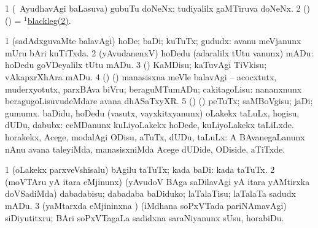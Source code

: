 \bentry
{}
\gl{\nA}
\bmng
\bnum
\num{1} (\kanmu\ AyudhavAgi baLasuva) gubuTu doNeNx; tudiyalilx gaMTiruva doNeNx. 
\num{2} (\birx) (\pArxparx) = \hyperref{kandict_b.pdf}{B}{blackleg(1)2}{$^1$blackleg(2)}. 
\enum
\emng
\eentry

\bentry
{}
\gl{\sakirx}
\bmng
\bnum
\num{1} (sadAdxguvaMte balavAgi) hoDe; baDi; kuTuTx; gududx:  avanu meVjanunx mUru bAri kuTiTxda. 
\num{2} (yAvudanenxV) hoDedu (adaralilx tUtu \mo vanunx) mADu:  hoDedu goVDeyalilx tUtu mADu. 
\num{3} (\ashi) KaMDisu; kaTuvAgi TiVkisu; vAkapxrXhAra mADu. 
\num{4} (\birx) (\ashi) manasisxna meVle balavAgi -- acocxtutx, muderxyotutx, parxBAva biVru; beraguMTumADu; cakitagoLisu:  nananxnunx beragugoLisuvudeMdare avana dhASaTxyXR. 
\num{5} (\birx) (\ashi) peTuTx; saMBoVgisu; jaDi; gumumx. 
 baDidu, hoDedu (vasutx, vayxkitxyanunx) 
\banum
{} oLakekx taLuLx, hogisu, dUDu, dabubx:  ceMDanunx kuLiyoLakekx hoDede, kuLiyoLakekx taLiLxde. 
 horakekx, Acege, modalAgi ODisu, aTuTx, dUDu, taLuLx:  A BAvanegaLanunx nAnu avana taleyiMda, manasisxniMda Acege dUDide, ODiside, aTiTxde. 
\eanum
\numie
\enum
\emng

\noindent
\gl{\akirx}
\bmng
\bnum
\num{1} (oLakekx parxveVshisalu) bAgilu taTuTx; kada baDi:  kada taTuTx. 
\num{2} (moVTAru yA itara eMjinunx) (yAvudoV BAga saDilavAgi yA itara yAMtirxka doVSadiMda) dabadabisu; dabadaba baDiduko; laTalaTisu; laTalaTa sadudx mADu. 
\num{3} (yaMtarxda eMjininxna \vi) (iMdhana soPxVTada pariNAmavAgi) siDiyutitxru; BAri soPxVTagaLa sadidxna saraNiyanunx sUsu, horabiDu. 
\enum
\emng

